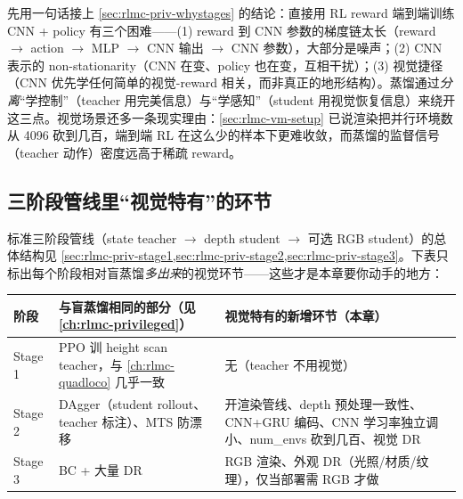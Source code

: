 先用一句话接上 \cref{sec:rlmc-priv-whystages} 的结论：直接用 RL reward 端到端训练 CNN + policy 有三个困难——(1) reward 到 CNN 参数的梯度链太长（reward $\to$ action $\to$ MLP $\to$ CNN 输出 $\to$ CNN 参数），大部分是噪声；(2) CNN 表示的 non-stationarity（CNN 在变、policy 也在变，互相干扰）；(3) 视觉捷径（CNN 优先学任何简单的视觉-reward 相关，而非真正的地形结构）。蒸馏通过\emph{分离}“学控制”（teacher 用完美信息）与“学感知”（student 用视觉恢复信息）来绕开这三点。视觉场景还多一条现实理由：\cref{sec:rlmc-vm-setup} 已说渲染把并行环境数从 4096 砍到几百，端到端 RL 在这么少的样本下更难收敛，而蒸馏的监督信号（teacher 动作）密度远高于稀疏 reward。

\subsection{三阶段管线里“视觉特有”的环节}
\label{sec:rlmc-vm-stages-vision}

标准三阶段管线（state teacher $\to$ depth student $\to$ 可选 RGB student）的总体结构见 \cref{sec:rlmc-priv-stage1,sec:rlmc-priv-stage2,sec:rlmc-priv-stage3}。下表只标出每个阶段相对盲蒸馏\emph{多出来}的视觉环节——这些才是本章要你动手的地方：

\begin{center}
\small
\begin{tabular}{@{}p{1.7cm}p{4.4cm}p{5.6cm}@{}}
\toprule
阶段 & 与盲蒸馏相同的部分（见 \cref{ch:rlmc-privileged}） & 视觉特有的新增环节（本章） \\
\midrule
Stage 1 & PPO 训 height scan teacher，与 \cref{ch:rlmc-quadloco} 几乎一致 & 无（teacher 不用视觉） \\
Stage 2 & DAgger（student rollout、teacher 标注）、MTS 防漂移 & 开渲染管线、depth 预处理一致性、CNN+GRU 编码、CNN 学习率独立调小、num\_envs 砍到几百、视觉 DR \\
Stage 3 & BC + 大量 DR & RGB 渲染、外观 DR（光照/材质/纹理），仅当部署需 RGB 才做 \\
\bottomrule
\end{tabular}
\end{center}


